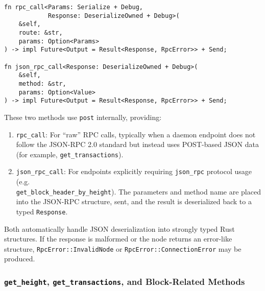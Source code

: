 \begin{verbatim}
fn rpc_call<Params: Serialize + Debug,
            Response: DeserializeOwned + Debug>(
    &self,
    route: &str,
    params: Option<Params>
) -> impl Future<Output = Result<Response, RpcError>> + Send;

fn json_rpc_call<Response: DeserializeOwned + Debug>(
    &self,
    method: &str,
    params: Option<Value>
) -> impl Future<Output = Result<Response, RpcError>> + Send;
\end{verbatim}

These two methods use \texttt{post} internally, providing:

\begin{enumerate}
    \item \texttt{rpc\_call}: For “raw” RPC calls, typically when a daemon
    endpoint does not follow the JSON-RPC 2.0 standard but instead uses
    POST-based JSON data (for example, \texttt{get\_transactions}).

    \item \texttt{json\_rpc\_call}: For endpoints explicitly requiring
    \texttt{json\_rpc} protocol usage (e.g. \\\texttt{get\_block\_header\_by\_height}).
    The parameters and method name are placed into the JSON-RPC structure, sent,
    and the result is deserialized back to a typed \texttt{Response}.
\end{enumerate}

Both automatically handle JSON deserialization into strongly typed Rust
structures.  If the response is malformed or the node returns an error-like
structure, \texttt{RpcError::InvalidNode} or \texttt{RpcError::ConnectionError}
may be produced.

\subsubsection{\texttt{get\_height}, \texttt{get\_transactions}, and Block-Related Methods}

